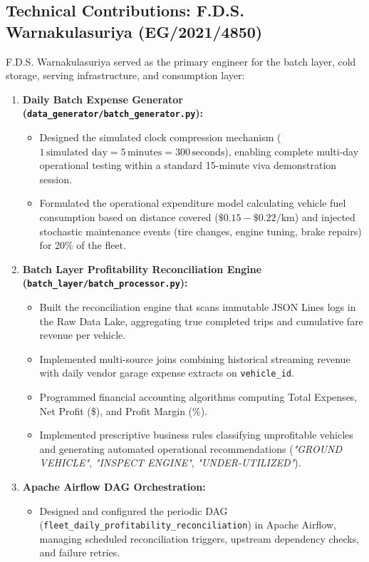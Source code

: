 \documentclass[11pt,a4paper]{article}
\begin{document}
\vspace{0.4cm}

\subsection{Technical Contributions: F.D.S. Warnakulasuriya (EG/2021/4850)}
F.D.S. Warnakulasuriya served as the primary engineer for the batch layer, cold storage, serving infrastructure, and consumption layer:

\begin{enumerate}
    \item \textbf{Daily Batch Expense Generator (\texttt{data\_generator/batch\_generator.py}):}
    \begin{itemize}
        \item Designed the simulated clock compression mechanism ($1\,\text{simulated day} = 5\,\text{minutes} = 300\,\text{seconds}$), enabling complete multi-day operational testing within a standard 15-minute viva demonstration session.
        \item Formulated the operational expenditure model calculating vehicle fuel consumption based on distance covered ($\$0.15 - \$0.22/\text{km}$) and injected stochastic maintenance events (tire changes, engine tuning, brake repairs) for 20\% of the fleet.
    \end{itemize}

    \item \textbf{Batch Layer Profitability Reconciliation Engine (\texttt{batch\_layer/batch\_processor.py}):}
    \begin{itemize}
        \item Built the reconciliation engine that scans immutable JSON Lines logs in the Raw Data Lake, aggregating true completed trips and cumulative fare revenue per vehicle.
        \item Implemented multi-source joins combining historical streaming revenue with daily vendor garage expense extracts on \texttt{vehicle\_id}.
        \item Programmed financial accounting algorithms computing Total Expenses, Net Profit (\$), and Profit Margin (\%).
        \item Implemented prescriptive business rules classifying unprofitable vehicles and generating automated operational recommendations (\textit{"GROUND VEHICLE"}, \textit{"INSPECT ENGINE"}, \textit{"UNDER-UTILIZED"}).
    \end{itemize}

    \item \textbf{Apache Airflow DAG Orchestration:}
    \begin{itemize}
        \item Designed and configured the periodic DAG (\texttt{fleet\_daily\_profitability\_reconciliation}) in Apache Airflow, managing scheduled reconciliation triggers, upstream dependency checks, and failure retries.
    \end{itemize}


\end{enumerate}
\end{document}
